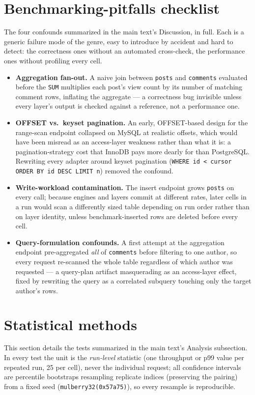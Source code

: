 \documentclass[11pt,a4paper]{article}
\begin{document}
\section{Benchmarking-pitfalls checklist}
\label{sup:pitfalls}
The four confounds summarized in the main text's Discussion, in full. Each is a generic failure
mode of the genre, easy to introduce by accident and hard to detect: the correctness ones
without an automated cross-check, the performance ones without profiling every cell.
\begin{itemize}
  \item \textbf{Aggregation fan-out.} A naive join between \texttt{posts} and \texttt{comments}
        evaluated before the \texttt{SUM} multiplies each post's view count by its number of
        matching comment rows, inflating the aggregate --- a correctness bug invisible unless
        every layer's output is checked against a reference, not a performance one.
  \item \textbf{OFFSET vs.\ keyset pagination.} An early, OFFSET-based design for the range-scan
        endpoint collapsed on MySQL at realistic offsets, which would have been misread as an
        access-layer weakness rather than what it is: a pagination-strategy cost that InnoDB
        pays more dearly for than PostgreSQL. Rewriting every adapter around keyset pagination
        (\texttt{WHERE id < cursor ORDER BY id DESC LIMIT n}) removed the confound.
  \item \textbf{Write-workload contamination.} The insert endpoint grows \texttt{posts} on
        every call; because engines and layers commit at different rates, later cells in a run
        would scan a differently sized table depending on run order rather than on layer
        identity, unless benchmark-inserted rows are deleted before every cell.
  \item \textbf{Query-formulation confounds.} A first attempt at the aggregation endpoint
        pre-aggregated \emph{all} of \texttt{comments} before filtering to one author, so every
        request re-scanned the whole table regardless of which author was requested --- a
        query-plan artifact masquerading as an access-layer effect, fixed by rewriting the query
        as a correlated subquery touching only the target author's rows.
\end{itemize}

\section{Statistical methods}
\label{sup:stats}
This section details the tests summarized in the main text's Analysis subsection. In every
test the unit is the \emph{run-level} statistic (one throughput or p99 value per repeated
run, 25 per cell), never the individual request; all confidence intervals are percentile
bootstraps resampling replicate indices (preserving the pairing) from a fixed seed
(\texttt{mulberry32(0x57a75)}), so every resample is reproducible.
\end{document}
